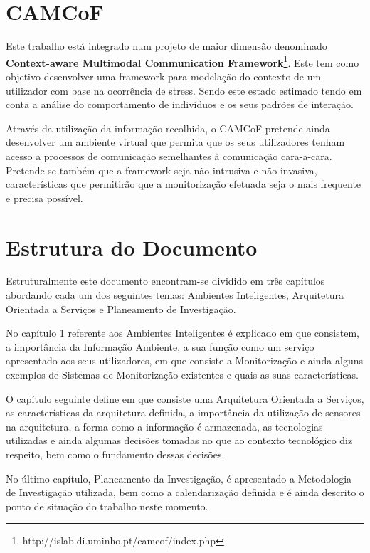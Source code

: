 \section{CAMCoF}
Este trabalho está integrado num projeto de maior dimensão denominado \textbf{Context-aware Multimodal Communication Framework}\footnote{http://islab.di.uminho.pt/camcof/index.php}. Este tem como objetivo desenvolver uma framework para modelação do contexto de um utilizador com base na ocorrência de stress. Sendo este estado estimado tendo em conta a análise do comportamento de indivíduos e os seus padrões de interação.

Através da utilização da informação recolhida, o CAMCoF pretende ainda desenvolver um ambiente virtual que permita que os seus utilizadores tenham acesso a processos de comunicação semelhantes à comunicação cara-a-cara. Pretende-se também que a framework seja não-intrusiva e não-invasiva, características que permitirão que a monitorização efetuada seja o mais frequente e precisa possível.

\section{Estrutura do Documento}

Estruturalmente este documento encontram-se dividido em três capítulos abordando cada um dos seguintes temas: Ambientes Inteligentes, Arquitetura Orientada a Serviços e Planeamento de Investigação. 

No capítulo 1 referente aos Ambientes Inteligentes é explicado em que consistem, a importância da Informação Ambiente, a sua função como um serviço apresentado aos seus utilizadores, em que consiste a Monitorização e ainda alguns exemplos de Sistemas de Monitorização existentes e quais as suas características.

O capítulo seguinte define em que consiste uma Arquitetura Orientada a Serviços, as características da arquitetura definida, a importância da utilização de sensores na arquitetura, a forma como a informação é armazenada, as tecnologias utilizadas e ainda algumas decisões tomadas no que ao contexto tecnológico diz respeito, bem como o fundamento dessas decisões.

No último capítulo, Planeamento da Investigação, é apresentado a Metodologia de Investigação utilizada, bem como a calendarização definida e é ainda descrito o ponto de situação do trabalho neste momento.

